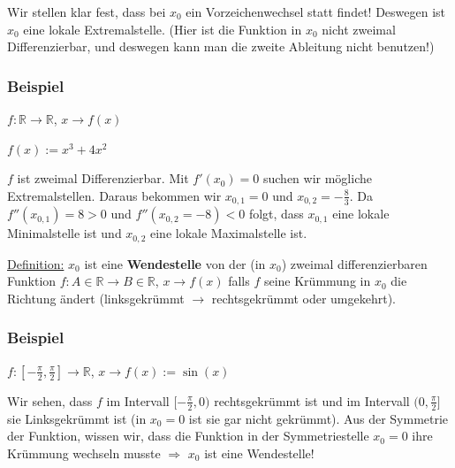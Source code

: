 \documentclass[11pt]{article} %
\begin{document}
Wir stellen klar fest, dass bei $x_0$ ein Vorzeichenwechsel statt findet! Deswegen ist $x_0$ eine lokale Extremalstelle. (Hier ist die Funktion in $x_0$ nicht zweimal Differenzierbar, und deswegen kann man die zweite Ableitung nicht benutzen!)

\subsubsection{Beispiel}
$f: \mathbb{R} \rightarrow \mathbb{R}$, $x\rightarrow f(x)$

$f(x) := x^3+ 4x^2$

$f$ ist zweimal Differenzierbar. Mit $f'(x_0) = 0$ suchen wir mögliche Extremalstellen. Daraus bekommen wir $x_{0,1} = 0$ und $x_{0,2} = -\frac{8}{3}$. Da $f''(x_{0,1})=8>0$ und $f''(x_{0,2}=-8)<0$ folgt, dass $x_{0,1}$ eine lokale Minimalstelle ist und $x_{0,2}$ eine lokale Maximalstelle ist.

\underline{Definition:} $x_0$ ist eine {\bf Wendestelle} von der (in $x_0$) zweimal differenzierbaren Funktion $f: A \in \mathbb{R} \rightarrow B \in \mathbb{R}$, $x \rightarrow f(x)$ falls $f$ seine Krümmung in $x_0$ die Richtung ändert (linksgekrümmt  $\rightarrow$ rechtsgekrümmt oder umgekehrt).\\

\subsubsection{Beispiel}

$f: [-\frac{\pi}{2},\frac{\pi}{2}] \rightarrow \mathbb{R}$, $x\rightarrow f(x) := \sin(x)$

Wir sehen, dass $f$ im Intervall $[-\frac{\pi}{2}, 0)$ rechtsgekrümmt ist und im Intervall $(0,\frac{\pi}{2}]$ sie Linksgekrümmt ist (in $x_0=0$ ist sie gar nicht gekrümmt). Aus der Symmetrie der Funktion, wissen wir, dass die Funktion in der Symmetriestelle $x_0=0$ ihre Krümmung wechseln musste $\Rightarrow$ $x_0$ ist eine Wendestelle!
\end{document}
